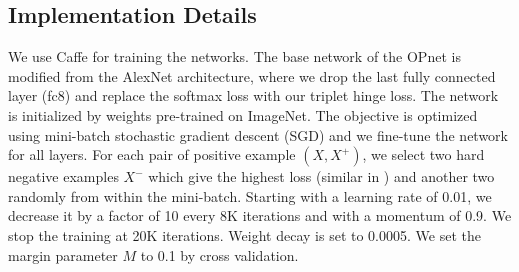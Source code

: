 \documentclass{article} %
\begin{document}

\subsection{Implementation Details}
We use Caffe \citep{jia2014caffe} for training the networks. The base network of the OPnet is modified from the AlexNet architecture, where we drop the last fully connected layer (fc8) and replace the softmax loss with our triplet hinge loss. The network is initialized by weights pre-trained on ImageNet. The objective is optimized using mini-batch stochastic gradient descent (SGD) and we fine-tune the network for all layers. For each pair of positive example $(X, X^+)$, we select two hard negative examples $X^-$ which give the highest loss (similar in \citep{DBLP:journals/corr/WangG15a}) and another two randomly from within the mini-batch. Starting with a learning rate of 0.01, we decrease it by a factor of 10 every 8K iterations and with a momentum of 0.9. We stop the training at 20K iterations. Weight decay is set to 0.0005. We set the margin parameter $M$ to 0.1 by cross validation.

\end{document}
